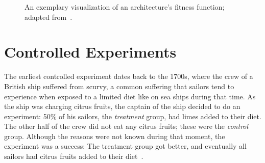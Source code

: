 \begin{figure}[h]
        \caption{An exemplary visualization of an architecture's fitness function; adapted from~\cite{WEB:EvolArch:2016}.}
        \label{figure:fundamentals:evolutionary:fitness}
\end{figure}

\section{Controlled Experiments}
\label{sec:fundamentals:experiments}

The earliest controlled experiment dates back to the 1700s, where the crew of a British ship suffered from scurvy, a common suffering that sailors tend to experience when exposed to a limited diet like on sea ships during that time.
As the ship was charging citrus fruits, the captain of the ship decided to do an experiment: 50\% of his sailors, the \emph{treatment} group, had limes added to their diet.
The other half of the crew did not eat any citrus fruits; these were the \emph{control} group.
Although the reasons were not known during that moment, the experiment was a success: The treatment group got better, and eventually all sailors had citrus fruits added to their diet~\cite{rossi2003evaluation,marks2000progress}.

